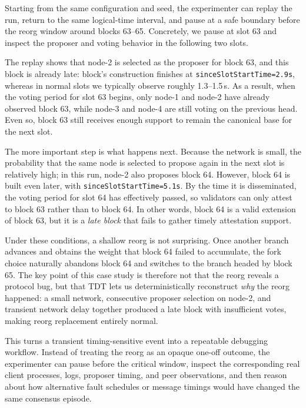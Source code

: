 Starting from the same configuration and seed, the experimenter can replay the run, return to the same logical-time interval, and pause at a safe boundary before the reorg window around blocks 63--65. Concretely, we pause at slot 63 and inspect the proposer and voting behavior in the following two slots.

The replay shows that node-2 is selected as the proposer for block 63, and this block is already late: block's construction finishes at \texttt{sinceSlotStartTime=2.9s}, whereas in normal slots we typically observe roughly 1.3--1.5\,s. As a result, when the voting period for slot 63 begins, only node-1 and node-2 have already observed block 63, while node-3 and node-4 are still voting on the previous head. Even so, block 63 still receives enough support to remain the canonical base for the next slot.

The more important step is what happens next. Because the network is small, the probability that the same node is selected to propose again in the next slot is relatively high; in this run, node-2 also proposes block 64. However, block 64 is built even later, with \texttt{sinceSlotStartTime=5.1s}. By the time it is disseminated, the voting period for slot 64 has effectively passed, so validators can only attest to block 63 rather than to block 64. In other words, block 64 is a valid extension of block 63, but it is a \emph{late block} that fails to gather timely attestation support.

Under these conditions, a shallow reorg is not surprising. Once another branch advances and obtains the weight that block 64 failed to accumulate, the fork choice naturally abandons block 64 and switches to the branch headed by block 65. The key point of this case study is therefore not that the reorg reveals a protocol bug, but that TDT lets us deterministically reconstruct \emph{why} the reorg happened: a small network, consecutive proposer selection on node-2, and transient network delay together produced a late block with insufficient votes, making reorg replacement entirely normal.

This turns a transient timing-sensitive event into a repeatable debugging workflow. Instead of treating the reorg as an opaque one-off outcome, the experimenter can pause before the critical window, inspect the corresponding real client processes, logs, proposer timing, and peer observations, and then reason about how alternative fault schedules or message timings would have changed the same consensus episode. 

